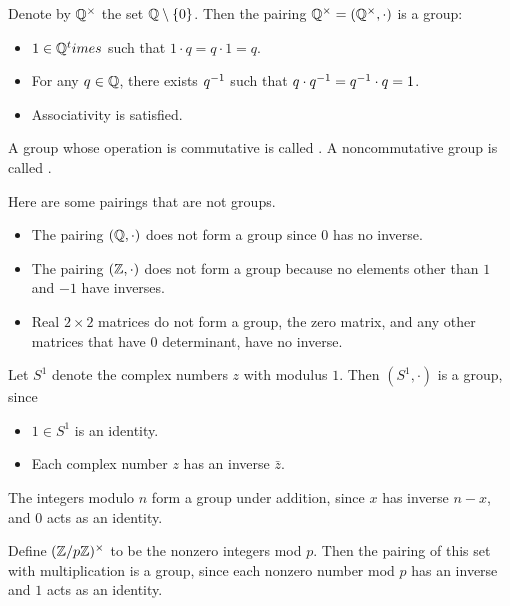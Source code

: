 \documentclass[11pt]{scrreport}
\begin{document}
\begin{example}
    Denote by $\mathbb Q^\times$ the set $\mathbb Q\setminus\{0\}$. Then the pairing $\mathbb Q^\times=(\mathbb Q^\times,\cdot)$ is a group:
    \begin{itemize}
        \item $1\in \mathbb Q^times$ such that $1\cdot q = q\cdot 1 = q$.
        \item For any $q\in\mathbb Q$, there exists $q^{-1}$ such that $q\cdot q^{-1} = q^{-1}\cdot q = 1$.
        \item Associativity is satisfied. 
    \end{itemize}
\end{example}
\begin{remark}
    A group whose operation is commutative is called . A noncommutative group is called .
\end{remark}
\begin{example}
    Here are some pairings that are not groups.
    \begin{itemize}
        \item The pairing $(\mathbb Q,\cdot)$ does not form a group since $0$ has no inverse.
        \item The pairing $(\mathbb Z, \cdot)$ does not form a group because no elements other than $1$ and $-1$ have inverses.
        \item Real $2\times 2$ matrices do not form a group, the zero matrix, and any other matrices that have $0$ determinant, have no inverse.
    \end{itemize}
\end{example}
\begin{example}
    Let $S^1$ denote the complex numbers $z$ with modulus $1$. Then $(S^1,\cdot)$ is a group, since
    \begin{itemize}
        \item $1\in S^1$ is an identity.
        \item Each complex number $z$ has an inverse $\bar z$. 
    \end{itemize}
\end{example}
\begin{example}
    The integers modulo $n$ form a group under addition, since $x$ has inverse $n-x$, and $0$ acts as an identity.
\end{example}
\begin{example}
    Define $(\mathbb Z/p\mathbb Z)^\times$ to be the nonzero integers mod $p$. Then the pairing of this set with multiplication is a group, since each nonzero number mod $p$ has an inverse and $1$ acts as an identity.
\end{example}
\end{document}

